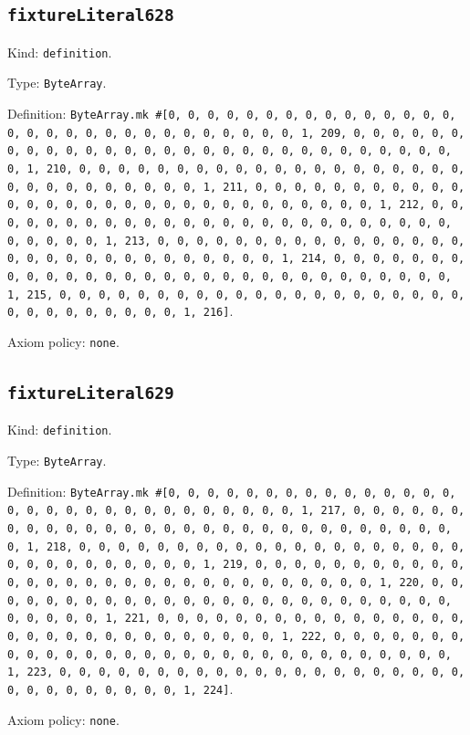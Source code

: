 \documentclass[11pt]{article}
\begin{document}
\subsection*{\texttt{fixtureLiteral628}}
\noindent Kind: \texttt{definition}.\par
\noindent Type: \texttt{ByteArray}.\par
\noindent Definition: \texttt{ByteArray.mk \#[0, 0, 0, 0, 0, 0, 0, 0, 0, 0, 0, 0, 0, 0, 0, 0, 0, 0, 0, 0, 0, 0, 0, 0, 0, 0, 0, 0, 0, 0, 1, 209, 0, 0, 0, 0, 0, 0, 0, 0, 0, 0, 0, 0, 0, 0, 0, 0, 0, 0, 0, 0, 0, 0, 0, 0, 0, 0, 0, 0, 0, 0, 1, 210, 0, 0, 0, 0, 0, 0, 0, 0, 0, 0, 0, 0, 0, 0, 0, 0, 0, 0, 0, 0, 0, 0, 0, 0, 0, 0, 0, 0, 0, 0, 1, 211, 0, 0, 0, 0, 0, 0, 0, 0, 0, 0, 0, 0, 0, 0, 0, 0, 0, 0, 0, 0, 0, 0, 0, 0, 0, 0, 0, 0, 0, 0, 1, 212, 0, 0, 0, 0, 0, 0, 0, 0, 0, 0, 0, 0, 0, 0, 0, 0, 0, 0, 0, 0, 0, 0, 0, 0, 0, 0, 0, 0, 0, 0, 1, 213, 0, 0, 0, 0, 0, 0, 0, 0, 0, 0, 0, 0, 0, 0, 0, 0, 0, 0, 0, 0, 0, 0, 0, 0, 0, 0, 0, 0, 0, 0, 1, 214, 0, 0, 0, 0, 0, 0, 0, 0, 0, 0, 0, 0, 0, 0, 0, 0, 0, 0, 0, 0, 0, 0, 0, 0, 0, 0, 0, 0, 0, 0, 1, 215, 0, 0, 0, 0, 0, 0, 0, 0, 0, 0, 0, 0, 0, 0, 0, 0, 0, 0, 0, 0, 0, 0, 0, 0, 0, 0, 0, 0, 0, 0, 1, 216]}.\par
\noindent Axiom policy: \texttt{none}.\par
\subsection*{\texttt{fixtureLiteral629}}
\noindent Kind: \texttt{definition}.\par
\noindent Type: \texttt{ByteArray}.\par
\noindent Definition: \texttt{ByteArray.mk \#[0, 0, 0, 0, 0, 0, 0, 0, 0, 0, 0, 0, 0, 0, 0, 0, 0, 0, 0, 0, 0, 0, 0, 0, 0, 0, 0, 0, 0, 0, 1, 217, 0, 0, 0, 0, 0, 0, 0, 0, 0, 0, 0, 0, 0, 0, 0, 0, 0, 0, 0, 0, 0, 0, 0, 0, 0, 0, 0, 0, 0, 0, 1, 218, 0, 0, 0, 0, 0, 0, 0, 0, 0, 0, 0, 0, 0, 0, 0, 0, 0, 0, 0, 0, 0, 0, 0, 0, 0, 0, 0, 0, 0, 0, 1, 219, 0, 0, 0, 0, 0, 0, 0, 0, 0, 0, 0, 0, 0, 0, 0, 0, 0, 0, 0, 0, 0, 0, 0, 0, 0, 0, 0, 0, 0, 0, 1, 220, 0, 0, 0, 0, 0, 0, 0, 0, 0, 0, 0, 0, 0, 0, 0, 0, 0, 0, 0, 0, 0, 0, 0, 0, 0, 0, 0, 0, 0, 0, 1, 221, 0, 0, 0, 0, 0, 0, 0, 0, 0, 0, 0, 0, 0, 0, 0, 0, 0, 0, 0, 0, 0, 0, 0, 0, 0, 0, 0, 0, 0, 0, 1, 222, 0, 0, 0, 0, 0, 0, 0, 0, 0, 0, 0, 0, 0, 0, 0, 0, 0, 0, 0, 0, 0, 0, 0, 0, 0, 0, 0, 0, 0, 0, 1, 223, 0, 0, 0, 0, 0, 0, 0, 0, 0, 0, 0, 0, 0, 0, 0, 0, 0, 0, 0, 0, 0, 0, 0, 0, 0, 0, 0, 0, 0, 0, 1, 224]}.\par
\noindent Axiom policy: \texttt{none}.\par
\end{document}
